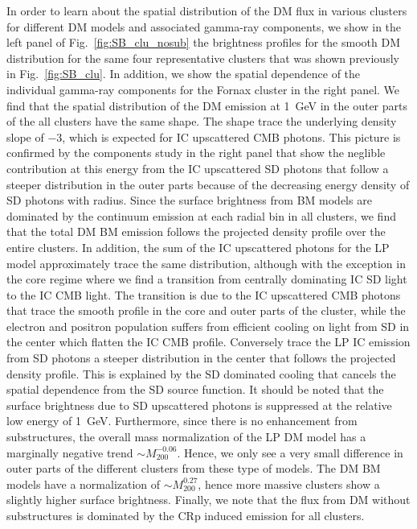 \documentclass[10pt,aps,pra,reprint,amsmath,amsfonts,amssymb,showpacs,nofootinbib,floatfix]{revtex4-1}
\def\del#1{{}}
\newcommand{\mvir}{M_{200}}
\begin{document}
\del{NEED TO REWRITE, JUMPING BACK AND FORTH BETWEEN PANELS} In order
to learn about the spatial distribution of the DM flux in various
clusters for different DM models and associated gamma-ray components,
we show in the left panel of Fig.~\ref{fig:SB_clu_nosub} the
brightness profiles for the smooth DM distribution for the same four
representative clusters that was shown previously in
Fig.~\ref{fig:SB_clu}. In addition, we show the spatial dependence of
the individual gamma-ray components for the Fornax cluster in the
right panel. We find that the spatial distribution of the DM emission
at 1~GeV in the outer parts of the all clusters have the same
shape. The shape trace the underlying density slope of $-3$, which is
expected for IC upscattered CMB photons. This picture is confirmed by
the components study in the right panel that show the neglible
contribution at this energy from the IC upscattered SD photons that
follow a steeper distribution in the outer parts because of the
decreasing energy density of SD photons with radius. Since the surface
brightness from BM models are dominated by the continuum emission at
each radial bin in all clusters, we find that the total DM BM emission
follows the projected density profile over the entire clusters. In
addition, the sum of the IC upscattered photons for the LP model
approximately trace the same distribution, although with the exception
in the core regime where we find a transition from centrally
dominating IC SD light to the IC CMB light. The transition is due to
the IC upscattered CMB photons that trace the smooth profile in the
core and outer parts of the cluster, while the electron and positron
population suffers from efficient cooling on light from SD in the
center which flatten the IC CMB profile. Conversely trace the LP IC
emission from SD photons a steeper distribution in the center that
follows the projected density profile. This is explained by the SD
dominated cooling that cancels the spatial dependence from the SD
source function. \del{In the left panel we also find some variation in
  the profiles for the different clusters in the central
  parts. Especially in the Fornax cluster, where we find a factor two
  larger flux compared to the other clusters. This is due to more
  efficient SD cooling of the dominating IC upscattered CMB photons in
  Fornax; a low X-ray luminous cluster has a low energy density in
  starlight and dust in our semi-analytic SD model.} It should be
noted that the surface brightness due to SD upscattered photons is
suppressed at the relative low energy of 1~GeV. Furthermore, since
there is no enhancement from substructures, the overall mass
normalization of the LP DM model has a marginally negative trend
$\sim\mvir^{-0.06}$. Hence, we only see a very small difference in
outer parts of the different clusters from these type of models. The
DM BM models have a normalization of $\sim\mvir^{0.27}$, hence more
massive clusters show a slightly higher surface brightness. Finally,
we note that the flux from DM without substructures is dominated by
the CRp induced emission for all clusters.
\end{document}
